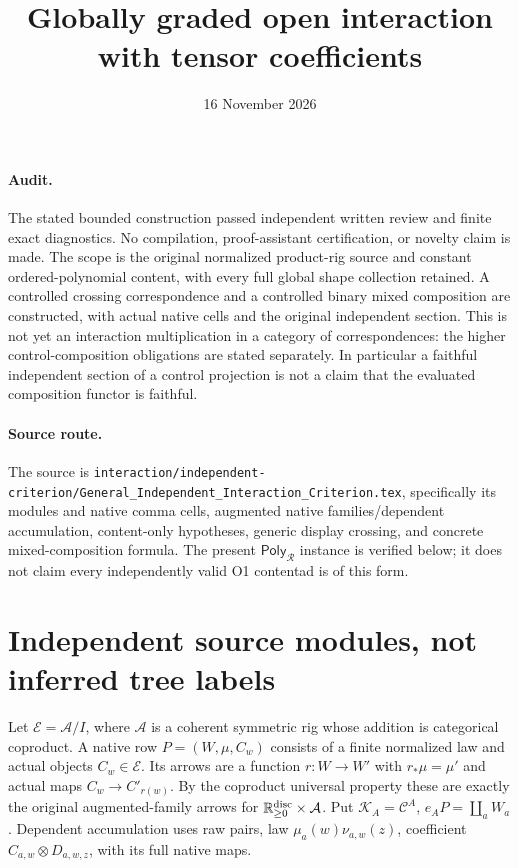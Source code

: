 \documentclass[11pt]{article}
\title{Globally graded open interaction with tensor coefficients}
\date{16 November 2026}
\begin{document}
\maketitle
\paragraph{Audit.} The stated bounded construction passed independent written review and finite exact diagnostics. No compilation, proof-assistant certification, or novelty claim is made. The scope is the original normalized product-rig source and constant ordered-polynomial content, with every full global shape collection retained. A controlled crossing correspondence and a controlled binary mixed composition are constructed, with actual native cells and the original independent section. This is not yet an interaction multiplication in a category of correspondences: the higher control-composition obligations are stated separately. In particular a faithful independent section of a control projection is not a claim that the evaluated composition functor is faithful.

\paragraph{Source route.} The source is \texttt{interaction/independent-criterion/General\_Independent\_Interaction\_Criterion.tex}, specifically its modules and native comma cells, augmented native families/dependent accumulation, content-only hypotheses, generic display crossing, and concrete mixed-composition formula. The present $\mathsf{Poly}_{\mathcal R}$ instance is verified below; it does not claim every independently valid O1 contentad is of this form.

\section{Independent source modules, not inferred tree labels}
Let $\mathcal E=\mathcal A/I$, where $\mathcal A$ is a coherent symmetric rig whose addition is categorical coproduct. A native row $P=(W,\mu,C_w)$ consists of a finite normalized law and actual objects $C_w\in\mathcal E$. Its arrows are a function $r:W\to W'$ with $r_*\mu=\mu'$ and actual maps $C_w\to C'_{r(w)}$. By the coproduct universal property these are exactly the original augmented-family arrows for $\mathbb R_{\geq0}^{\rm disc}\times\mathcal A$. Put $\mathcal K_A=\mathcal C^A$, $e_AP=\coprod_a W_a$. Dependent accumulation uses raw pairs, law $\mu_a(w)\nu_{a,w}(z)$, coefficient $C_{a,w}\otimes D_{a,w,z}$, with its full native maps.
\end{document}
